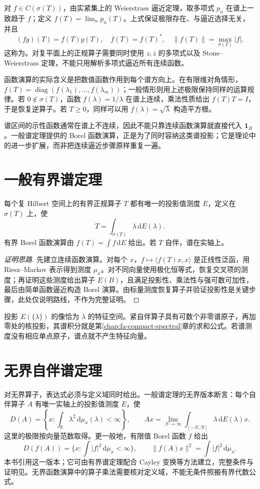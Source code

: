 \documentclass[UTF8,12pt,a4paper,fontset=fandol]{ctexbook}
\begin{document}
对 $f\in C(\sigma(T))$，由实紧集上的 Weierstrass 逼近定理，取多项式 $p_n$ 在谱上一致趋于 $f$；定义 $f(T)=\lim_np_n(T)$。上式保证极限存在、与逼近选择无关，并且
\[
 (fg)(T)=f(T)g(T),\quad \overline f(T)=f(T)^*,\quad
 \|f(T)\|=\max_{\sigma(T)}|f|.
\]
这称为。对复平面上的正规算子需要同时使用 $z,\overline z$ 的多项式以及 Stone--Weierstrass 定理，不能只用解析多项式逼近所有连续函数。

函数演算的实际含义是把数值函数作用到每个谱方向上。在有限维对角情形，$f(T)=\operatorname{diag}(f(\lambda_1),\ldots,f(\lambda_m))$；一般情形则用上述极限保持同样的运算规律。若 $0\notin\sigma(T)$，函数 $f(\lambda)=1/\lambda$ 在谱上连续，乘法性质给出 $f(T)T=I$，于是恢复逆算子。若 $T\geq0$，同样可以用 $f(\lambda)=\sqrt\lambda$ 构造平方根。

谱区间的示性函数通常在谱上不连续，因此不能只靠连续函数演算就直接代入 $\mathbf1_B$。一般谱定理提供的 Borel 函数演算，正是为了同时容纳这类谱投影；它是理论中的进一步扩展，而非把连续逼近步骤原样重复一遍。

\section{一般有界谱定理}
\begin{theorem}\label{thm:fa-general-spectral}
每个复 Hilbert 空间上的有界正规算子 $T$ 都有唯一的投影值测度 $E$，定义在 $\sigma(T)$ 上，使
\begin{equation}
 T=\int_{\sigma(T)}\lambda\,\mathrm dE(\lambda).
 \label{eq:fa-general-spectral-integral}
\end{equation}
有界 Borel 函数演算由 $f(T)=\int f\,\mathrm dE$ 给出。若 $T$ 自伴，谱在实轴上。
\end{theorem}
\begin{proof}[证明思路]
先建立连续函数演算。对每个 $x$，$f\mapsto\langle f(T)x,x\rangle$ 是正线性泛函，用 Riesz--Markov 表示得到测度 $\mu_x$。对不同向量使用极化恒等式，恢复交叉项的测度；再证明这些测度给出算子 $E(B)$，且满足投影性、乘法性与强可数可加性，最后由简单函数逼近构造 Borel 演算。由标量测度恢复算子并验证投影性是关键步骤，此处仅说明路线，不作为完整证明。
\end{proof}
投影 $E(\{\lambda\})$ 的像恰为 $\lambda$ 的特征空间。紧自伴算子具有可数个非零谱原子，再加零处的核投影，其谱积分就是第\ref{chap:fa-compact-spectral}章的求和公式。若谱测度没有相应单点原子，谱点就不产生特征向量。

\section{无界自伴谱定理}
对无界算子，表达式必须与定义域同时给出。一般谱定理的无界版本断言：每个自伴算子 $A$ 有唯一实轴上的投影值测度 $E$，使
\[
 D(A)=\left\{x:\int_{\mathbb R}\lambda^2\,\mathrm d\mu_x(\lambda)<\infty\right\},
 \qquad Ax=\lim_{N\to\infty}\int_{[-N,N]}\lambda\,\mathrm dE(\lambda)x.
\]
这里的极限按向量范数取得。更一般地，有限值 Borel 函数 $f$ 给出
\[
 D(f(A))=\{x:\int|f|^2\,\mathrm d\mu_x<\infty\},\qquad
 \|f(A)x\|^2=\int|f|^2\,\mathrm d\mu_x.
\]
本书引用这一版本；它可由有界谱定理配合 Cayley 变换等方法建立，完整条件与证明见\cite{teschl}。无界函数演算中的算子乘法需要核对定义域，不能无条件照搬有界代数公式。
\end{document}
